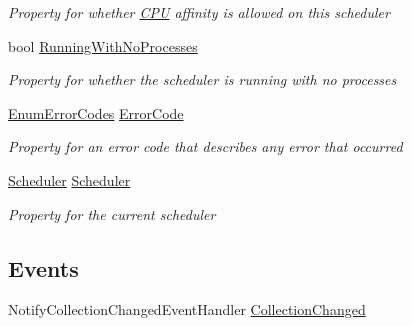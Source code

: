 \begin{DoxyCompactItemize}
\begin{DoxyCompactList}\small\item\em Property for whether \hyperlink{namespace_c_p_u___o_s___simulator_1_1_c_p_u}{C\+P\+U} affinity is allowed on this scheduler \end{DoxyCompactList}\item 
bool \hyperlink{class_c_p_u___o_s___simulator_1_1_operating___system_1_1_o_s_core_a1f01594c8f33961b5dc5ffffaf7644ce}{Running\+With\+No\+Processes}
\begin{DoxyCompactList}\small\item\em Property for whether the scheduler is running with no processes \end{DoxyCompactList}\item 
\hyperlink{namespace_c_p_u___o_s___simulator_1_1_operating___system_aea0b669d1bbf5690ae34ac2f8bef9470}{Enum\+Error\+Codes} \hyperlink{class_c_p_u___o_s___simulator_1_1_operating___system_1_1_o_s_core_a77a647e293c14574919b144cb2e8998f}{Error\+Code}
\begin{DoxyCompactList}\small\item\em Property for an error code that describes any error that occurred \end{DoxyCompactList}\item 
\hyperlink{class_c_p_u___o_s___simulator_1_1_operating___system_1_1_scheduler}{Scheduler} \hyperlink{class_c_p_u___o_s___simulator_1_1_operating___system_1_1_o_s_core_aa97bbf90ba03bd17c02f889189108455}{Scheduler}
\begin{DoxyCompactList}\small\item\em Property for the current scheduler \end{DoxyCompactList}\end{DoxyCompactItemize}
\subsection*{Events}
\begin{DoxyCompactItemize}
\item 
Notify\+Collection\+Changed\+Event\+Handler \hyperlink{class_c_p_u___o_s___simulator_1_1_operating___system_1_1_o_s_core_abcbb2efff8a4078fae3edb9b31f62198}{Collection\+Changed}
\end{DoxyCompactItemize}
